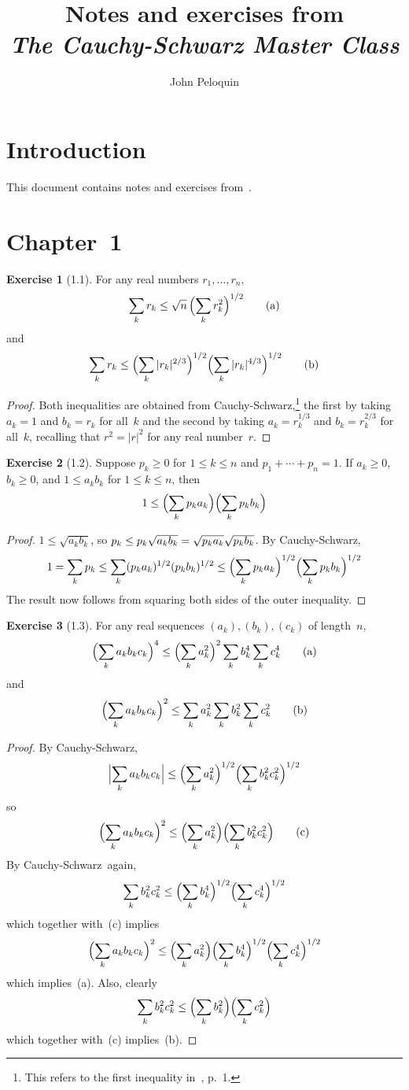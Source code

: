 \documentclass[letterpaper,12pt]{article}
\title{Notes and exercises from\\\textit{The Cauchy-Schwarz Master Class}}
\author{John Peloquin}
\date{}
\newcommand{\CS}{Cauchy-Schwarz}
\newcommand{\Biglp}[1]{\Bigl({#1}\Bigr)}
\newcommand{\abs}[1]{|{#1}|}
\newcommand{\Biglabs}[1]{\Bigl|{#1}\Bigr|}
\theoremstyle{definition}
\newtheorem*{exer}{Exercise}
\theoremstyle{remark}
\begin{document}
\maketitle

\section*{Introduction}
This document contains notes and exercises from~\cite{steele}.

\section*{Chapter~1}
\begin{exer}[1.1]
For any real numbers \(r_1,\ldots,r_n\),
\[\sum_k r_k\le\sqrt{n}\,\Biglp{\sum_k r_k^2}^{1/2}\tag{a}\]
and
\[\sum_k r_k\le\Biglp{\sum_k\abs{r_k}^{2/3}}^{1/2}\Biglp{\sum_k\abs{r_k}^{4/3}}^{1/2}\tag{b}\]
\end{exer}
\begin{proof}
Both inequalities are obtained from \CS,\footnote{This refers to the first inequality in~\cite{steele}, p.~1.} the first by taking \(a_k=1\) and \(b_k=r_k\) for all~\(k\) and the second by taking \(a_k=r_k^{1/3}\) and \(b_k=r_k^{2/3}\) for all~\(k\), recalling that \(r^2=\abs{r}^2\) for any real number~\(r\).
\end{proof}

\begin{exer}[1.2]
Suppose \(p_k\ge 0\) for \(1\le k\le n\) and \(p_1+\cdots+p_n=1\). If \(a_k\ge 0\), \(b_k\ge 0\), and \(1\le a_kb_k\) for \(1\le k\le n\), then
\[1\le\Biglp{\sum_k p_ka_k}\Biglp{\sum_k p_kb_k}\]
\end{exer}
\begin{proof}
\(1\le\sqrt{a_kb_k}\), so \(p_k\le p_k\sqrt{a_kb_k}=\sqrt{p_ka_k\vphantom{b_k}}\sqrt{p_kb_k}\). By \CS,
\[1=\sum_k p_k\le\sum_k(p_ka_k)^{1/2}(p_kb_k)^{1/2}\le\Biglp{\sum_k p_ka_k}^{1/2}\Biglp{\sum_k p_kb_k}^{1/2}\]
The result now follows from squaring both sides of the outer inequality.
\end{proof}

\begin{exer}[1.3]
For any real sequences \((a_k),(b_k),(c_k)\) of length~\(n\),
\[\Biglp{\sum_k a_kb_kc_k}^4\le\Biglp{\sum_k a_k^2}^2\sum_k b_k^4\sum_k c_k^4\tag{a}\]
and
\[\Biglp{\sum_k a_kb_kc_k}^2\le\sum_k a_k^2\sum_k b_k^2\sum_k c_k^2\tag{b}\]
\end{exer}
\begin{proof}
By \CS,
\[\Biglabs{\sum_k a_kb_kc_k}\le\Biglp{\sum_k a_k^2}^{1/2}\Biglp{\sum_k b_k^2c_k^2}^{1/2}\]
so
\[\Biglp{\sum_k a_kb_kc_k}^2\le\Biglp{\sum_k a_k^2}\Biglp{\sum_k b_k^2c_k^2}\tag{c}\]
By \CS\ again,
\[\sum_k b_k^2c_k^2\le\Biglp{\sum_k b_k^4}^{1/2}\Biglp{\sum_k c_k^4}^{1/2}\]
which together with~(c) implies
\[\Biglp{\sum_k a_kb_kc_k}^2\le\Biglp{\sum_k a_k^2}\Biglp{\sum_k b_k^4}^{1/2}\Biglp{\sum_k c_k^4}^{1/2}\]
which implies~(a). Also, clearly
\[\sum_k b_k^2c_k^2\le\Biglp{\sum_k b_k^2}\Biglp{\sum_k c_k^2}\]
which together with~(c) implies~(b).
\end{proof}
\end{document}
